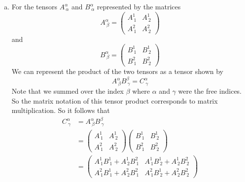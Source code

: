 \documentclass[11pt]{article}
\numberwithin{equation}{section}
\begin{document}
\begin{enumerate}[(a)]
\item
For the tensors $A^{\alpha}_{\ \alpha}$ and $B^{\alpha}_{\ \alpha}$ represented by the matrices 
$$A^{\alpha}_{\ \beta} = \left(\begin{array}{cc}
			A^1_{\ 1} &A^1_{\ 2}\\
			A^2_{\ 1} &A^2_{\ 2}
			\end{array}\right)$$
and 
$$B^{\alpha}_{\ \beta} = \left(\begin{array}{cc}
			B^1_{\ 1} &B^1_{\ 2}\\
			B^2_{\ 1} &B^2_{\ 2}
			\end{array}\right)$$
We can represent the product of the two tensors as a tensor shown by
$$A^{\alpha}_{\ \beta}B^{\beta}_{\ \gamma} = C^{\alpha}_{\ \gamma}$$
Note that we summed over the index $\beta$ where $\alpha$ and $\gamma$ were the free indices. So the matrix notation of this tensor product corresponds to matrix multiplication. So it follows that
\begin{align*}
C^{\alpha}_{\ \gamma} &= A^{\alpha}_{\ \beta}B^{\beta}_{\ \gamma}\\
&= \left(\begin{array}{cc}
	A^1_{\ 1} &A^1_{\ 2}\\
	A^2_{\ 1} &A^2_{\ 2}
	\end{array}\right)
	\left(\begin{array}{cc}
	B^1_{\ 1} &B^1_{\ 2}\\
	B^2_{\ 1} &B^2_{\ 2}
	\end{array}\right)\\
&= 	\left(\begin{array}{cc}
	A^1_{\ 1}B^1_{\ 1} +A^1_{\ 2}B^2_{\ 1} &A^1_{\ 1}B^1_{\ 2} +A^1_{\ 2}B^2_{\ 2}\\
	A^2_{\ 1}B^1_{\ 1} +A^2_{\ 2}B^2_{\ 1} &A^2_{\ 1}B^1_{\ 2} +A^2_{\ 2}B^2_{\ 2}
	\end{array}\right)
\end{align*}


\end{enumerate}
\end{document}
